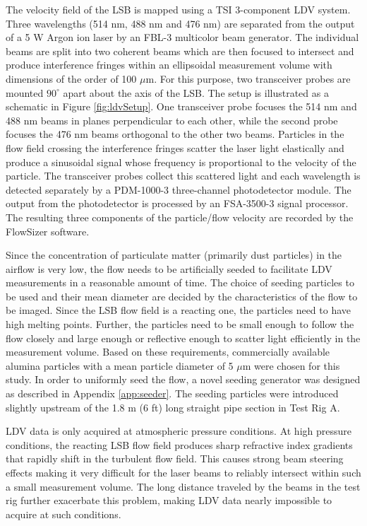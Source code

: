 The velocity field of the LSB is mapped using a TSI 3-component LDV system.
Three wavelengths (514 nm, 488 nm and 476 nm) are separated from the output of a 5 W Argon ion laser by an FBL-3 multicolor beam generator.
The individual beams are split into two coherent beams which are then focused to intersect and produce interference fringes within an ellipsoidal measurement volume with dimensions of the order of 100 \(\mu\)m.
For this purpose, two transceiver probes are mounted \(90^\circ\) apart about the axis of the LSB.
The setup is illustrated as a schematic in Figure \ref{fig:ldvSetup}.
One transceiver probe focuses the 514 nm and 488 nm beams in planes perpendicular to each other, while the second probe focuses the 476 nm beams orthogonal to the other two beams.
Particles in the flow field crossing the interference fringes scatter the laser light elastically and produce a sinusoidal signal whose frequency is proportional to the velocity of the particle.
The transceiver probes collect this scattered light and each wavelength is detected separately by a PDM-1000-3 three-channel photodetector module.
The output from the photodetector is processed by an FSA-3500-3 signal processor.
The resulting three components of the particle/flow velocity are recorded by the FlowSizer software.

Since the concentration of particulate matter (primarily dust particles) in the airflow is very low, the flow needs to be artificially seeded to facilitate LDV measurements in a reasonable amount of time.
The choice of seeding particles to be used and their mean diameter are decided by the characteristics of the flow to be imaged.\cite{1997-melling}
Since the LSB flow field is a reacting one, the particles need to have high melting points.
Further, the particles need to be small enough to follow the flow closely and large enough or reflective enough to scatter light efficiently in the measurement volume.
Based on these requirements, commercially available alumina particles with a mean particle diameter of 5 \(\mu\)m were chosen for this study.
In order to uniformly seed the flow, a novel seeding generator was designed as described in Appendix \ref{app:seeder}.
The seeding particles were introduced slightly upstream of the 1.8 m (6 ft) long straight pipe section in Test Rig A.

LDV data is only acquired at atmospheric pressure conditions.
At high pressure conditions, the reacting LSB flow field produces sharp refractive index gradients that rapidly shift in the turbulent flow field.
This causes strong beam steering effects making it very difficult for the laser beams to reliably intersect within such a small measurement volume.
The long distance traveled by the beams in the test rig further exacerbate this problem, making LDV data nearly impossible to acquire at such conditions.

